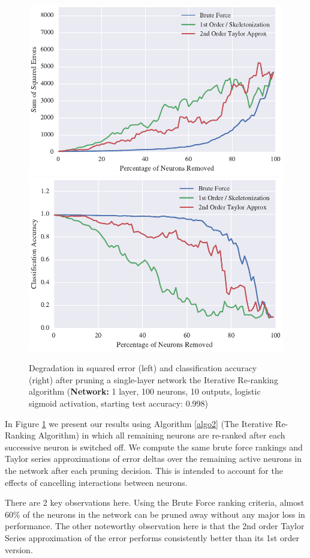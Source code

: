 \begin{figure}[!hb]
\centering
\includegraphics[width=0.49\linewidth]{png/mnist-acc99-iterative-rerank-method.pdf}
\includegraphics[width=0.49\linewidth]{png/mnist-acc99-iterative-rerank-accuracy.pdf}
\caption{Degradation in squared error (left) and classification accuracy (right) after pruning a single-layer network the Iterative Re-ranking algorithm (\textbf{Network:} 1 layer, 100 neurons, 10 outputs, logistic sigmoid activation, starting test accuracy: 0.998)}
\label{fig:mnist-re-ranking-single-layer}
\end{figure}

In Figure \ref{fig:mnist-re-ranking-single-layer} we present our results using Algorithm \ref{algo2} (The Iterative Re-Ranking Algorithm) in which all remaining neurons are re-ranked after each successive neuron is switched off. We compute the same brute force rankings and Taylor series approximations of error deltas over the remaining active neurons in the network after each pruning decision. This is intended to account for the effects of cancelling interactions between neurons. 

There are 2 key observations here. Using the Brute Force ranking criteria, almost 60\% of the neurons in the network can be pruned away without any major loss in performance. The other noteworthy observation here is that the 2nd order Taylor Series approximation of the error performs consistently better than its 1st order version.


